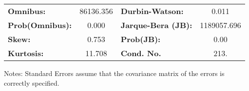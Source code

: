 \begin{center}
\begin{tabular}{lcccccc}
\bottomrule
\end{tabular}
\begin{tabular}{lclc}
\textbf{Omnibus:}       & 86136.356 & \textbf{  Durbin-Watson:     } &      0.011   \\
\textbf{Prob(Omnibus):} &    0.000  & \textbf{  Jarque-Bera (JB):  } & 1189057.696  \\
\textbf{Skew:}          &    0.753  & \textbf{  Prob(JB):          } &       0.00   \\
\textbf{Kurtosis:}      &   11.708  & \textbf{  Cond. No.          } &       213.   \\
\bottomrule
\end{tabular}
\end{center}

Notes: \newline
 [1] Standard Errors assume that the covariance matrix of the errors is correctly specified.